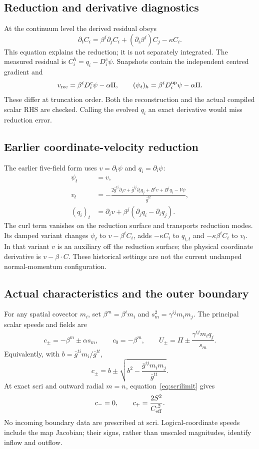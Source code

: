 \documentclass[11pt,letterpaper]{article}
\newcommand{\G}{\bar g}
\begin{document}
\subsection{Reduction and derivative diagnostics}
At the continuum level the derived residual obeys
\begin{equation}
 \partial_t C_i=\beta^j\partial_jC_i+(\partial_i\beta^j)C_j-\kappa C_i.
\end{equation}
This equation explains the reduction; it is not separately integrated. The measured residual is $C_i^h=q_i-D_i^c\psi$. Snapshots contain the independent centred gradient and
\begin{equation}
 v_{\rm rec}=\beta^iD_i^c\psi-\alpha\Pi,
 \qquad (\psi_t)_h=\beta^iD_i^{\rm up}\psi-\alpha\Pi.
\end{equation}
These differ at truncation order. Both the reconstruction and the actual compiled scalar RHS are checked. Calling the evolved $q_i$ an exact derivative would miss reduction error.

\clearpage
\subsection{Earlier coordinate-velocity reduction}
The earlier five-field form uses $v=\partial_t\psi$ and $q_i=\partial_i\psi$:
\begin{align}
 \psi_t&=v,\\
 v_t&=-\frac{2\G^{ti}\partial_iv+\G^{ij}\partial_iq_j+B^tv+B^iq_i-V\psi}{\G^{tt}},\\
 (q_i)_t&=\partial_iv+\beta^j(\partial_jq_i-\partial_iq_j).
\end{align}
The curl term vanishes on the reduction surface and transports reduction modes. Its damped variant changes $\psi_t$ to $v-\beta^iC_i$, adds $-\kappa C_i$ to $q_{i,t}$ and $-\kappa\beta^iC_i$ to $v_t$. In that variant $v$ is an auxiliary off the reduction surface; the physical coordinate derivative is $v-\beta\cdot C$. These historical settings are not the current undamped normal-momentum configuration.

\subsection{Actual characteristics and the outer boundary}
For any spatial covector $m_i$, set $\beta^m=\beta^im_i$ and $s_m^2=\gamma^{ij}m_im_j$. The principal scalar speeds and fields are
\begin{equation}
 c_\pm=-\beta^m\pm\alpha s_m,\qquad c_0=-\beta^m,\qquad
 U_\pm=\Pi\pm\frac{\gamma^{ij}m_iq_j}{s_m}.
\end{equation}
Equivalently, with $b=\G^{ti}m_i/\G^{tt}$,
\begin{equation}
 c_\pm=b\pm\sqrt{b^2-\frac{\G^{ij}m_im_j}{\G^{tt}}}.
\end{equation}
At exact scri and outward radial $m=n$, equation~\eqref{eq:scrilimit} gives
\begin{equation}
 c_-=0,\qquad c_+=\frac{2S^2}{C_{\rm eff}^{,2}}.
\end{equation}
No incoming boundary data are prescribed at scri. Logical-coordinate speeds include the map Jacobian; their signs, rather than unscaled magnitudes, identify inflow and outflow.
\end{document}
